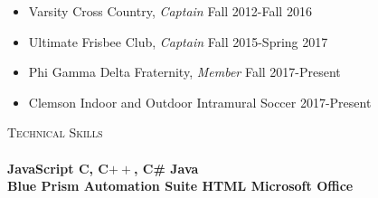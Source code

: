 \documentclass[a4paper]{article}
\newcommand{\lineunder} {
    \vspace*{-8pt} \\
    \hspace*{-18pt} \hrulefill \\
}
\newcommand{\header} [1] {
    {\hspace*{-18pt}\vspace*{6pt} \textsc{#1}}
    \vspace*{-6pt} \lineunder
}
\begin{document}
\begin{itemize}
\item Varsity Cross Country, \textit{Captain} \hfill \hfill Fall 2012-Fall 2016 \vspace{-5pt} 
\item Ultimate Frisbee Club, \textit{Captain} \hfill \hfill Fall 2015-Spring 2017 \vspace{-5pt}  
\item Phi Gamma Delta Fraternity, \textit{Member} \hfill \hfill Fall 2017-Present \vspace{-5pt} 
\item Clemson Indoor and Outdoor Intramural Soccer \hfill \hfill 2017-Present \vspace{-5pt} 
\end{itemize}
\header {Technical Skills} 
\textbf{JavaScript \hspace{130pt}   C, C$++$, C\# \hspace{155pt} Java} \\
\textbf{Blue Prism Automation Suite \hspace{49pt} HTML \hspace{111pt} Microsoft Office}
\end{document}
